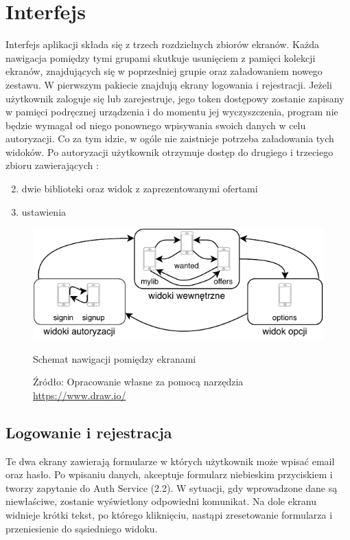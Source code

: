 \chapter{Interfejs}
\label{cha:interfejs}

Interfejs aplikacji składa się z trzech rozdzielnych zbiorów ekranów. Każda nawigacja pomiędzy tymi grupami skutkuje usunięciem z pamięci kolekcji ekranów, znajdujących się w poprzedniej grupie oraz załadowaniem nowego zestawu.
W pierwszym pakiecie znajdują ekrany logowania i rejestracji. Jeżeli użytkownik zaloguje się lub zarejestruje, jego token dostępowy zostanie zapisany w pamięci podręcznej urządzenia i do momentu jej wyczyszczenia, program nie będzie wymagał od niego ponownego wpisywania swoich danych w celu autoryzacji. Co za tym idzie, w ogóle nie zaistnieje potrzeba załadowania tych widoków.
Po autoryzacji użytkownik otrzymuje dostęp do drugiego i trzeciego zbioru zawierających :
\begin{enumerate}
    \setcounter{enumi}{1}
    \item dwie biblioteki oraz widok z zaprezentowanymi ofertami
    \item ustawienia
\end{enumerate} 

\begin{figure}[H]
	\centering
	\includegraphics[width=\linewidth]{navig.pdf}
	\caption{\centering Schemat nawigacji pomiędzy ekranami}
	\caption*{\centering Źródło: {Opracowanie własne za pomocą narzędzia \url{https://www.draw.io/}}}
\end{figure}

\section{Logowanie i rejestracja}
Te dwa ekrany zawierają formularze w których użytkownik może wpisać email oraz hasło. Po wpisaniu danych, akceptuje formularz niebieskim przyciskiem i tworzy zapytanie do Auth Service (2.2). W sytuacji, gdy wprowadzone dane są niewłaściwe, zostanie wyświetlony odpowiedni komunikat.
Na dole ekranu widnieje krótki tekst, po którego kliknięciu, nastąpi zresetowanie formularza i przeniesienie do sąsiedniego widoku.

